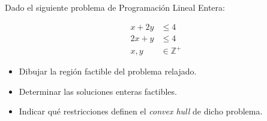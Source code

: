 Dado el siguiente problema de Programación Lineal Entera:

\[
\begin{aligned}
x + 2y &\le 4 \\
2x + y &\le 4 \\
x, y &\in \mathbb{Z^+}
\end{aligned}
\]

\begin{itemize}
\item[a)] Dibujar la región factible del problema relajado.
\item[b)] Determinar las soluciones enteras factibles.
\item[c)] Indicar qué restricciones definen el \textit{convex hull} de dicho problema.
\end{itemize}

\begin{center}
\end{center}